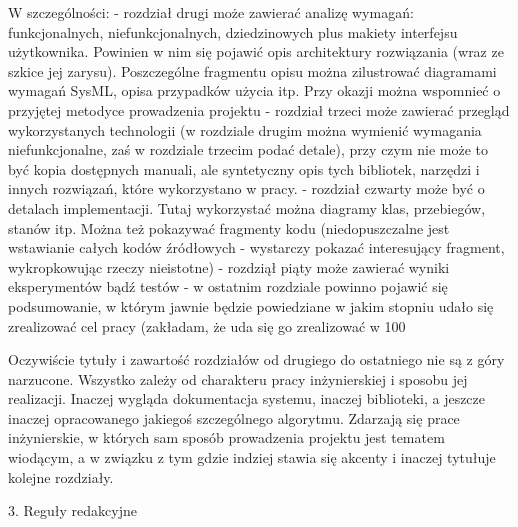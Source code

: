 W szczególności:
   - rozdział drugi może zawierać analizę wymagań: funkcjonalnych, niefunkcjonalnych, dziedzinowych plus makiety interfejsu użytkownika. Powinien w nim się pojawić opis architektury rozwiązania (wraz ze szkice jej zarysu). Poszczególne fragmentu opisu można zilustrować diagramami wymagań SysML, opisa przypadków użycia itp. Przy okazji można wspomnieć o przyjętej metodyce prowadzenia projektu
   - rozdział trzeci może zawierać przegląd wykorzystanych technologii (w rozdziale drugim można wymienić wymagania niefunkcjonalne, zaś w rozdziale trzecim podać detale), przy czym nie może to być kopia dostępnych manuali, ale syntetyczny opis tych bibliotek, narzędzi i innych rozwiązań, które wykorzystano w pracy.
   - rozdział czwarty może być o detalach implementacji. Tutaj wykorzystać można diagramy klas, przebiegów, stanów itp. Można też pokazywać fragmenty kodu (niedopuszczalne jest wstawianie całych kodów źródłowych - wystarczy pokazać interesujący fragment, wykropkowując rzeczy nieistotne)
   - rozdziął piąty może zawierać wyniki eksperymentów bądź testów
   - w ostatnim rozdziale powinno pojawić się podsumowanie, w którym jawnie będzie powiedziane w jakim stopniu udało się zrealizować cel pracy (zakładam, że uda się go zrealizować w 100%

Oczywiście tytuły i zawartość rozdziałów od drugiego do ostatniego nie są z góry narzucone. Wszystko zależy od charakteru pracy inżynierskiej i sposobu jej realizacji. Inaczej wygląda dokumentacja systemu, inaczej biblioteki, a jeszcze inaczej opracowanego jakiegoś szczególnego algorytmu. Zdarzają się prace inżynierskie, w których sam sposób prowadzenia projektu jest tematem wiodącym, a w związku z tym gdzie indziej stawia się akcenty i inaczej tytułuje kolejne rozdziały.

3. Reguły redakcyjne

